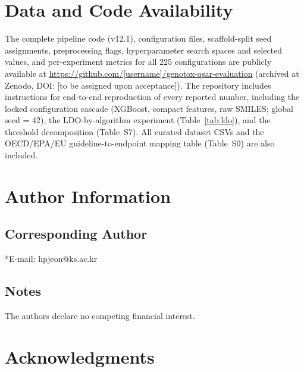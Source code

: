 \section*{Data and Code Availability}

The complete pipeline code (v12.1), configuration files, scaffold-split seed assignments, 
preprocessing flags, hyperparameter search spaces and selected values, and per-experiment 
metrics for all 225 configurations are publicly available at 
\url{https://github.com/[username]/genotox-qsar-evaluation} 
(archived at Zenodo, DOI: [to be assigned upon acceptance]). The repository includes 
instructions for end-to-end reproduction of every reported number, including the locked 
configuration cascade (XGBoost, compact features, raw SMILES; global seed = 42), the 
LDO-by-algorithm experiment (Table~\ref{tab:ldo}), and the threshold decomposition 
(Table~S7). All curated dataset CSVs and the OECD/EPA/EU guideline-to-endpoint mapping 
table (Table~S0) are also included.


\section*{Author Information}

\subsection*{Corresponding Author}
*E-mail: hpjeon@ks.ac.kr

\subsection*{Notes}
The authors declare no competing financial interest.

\section*{Acknowledgments}

